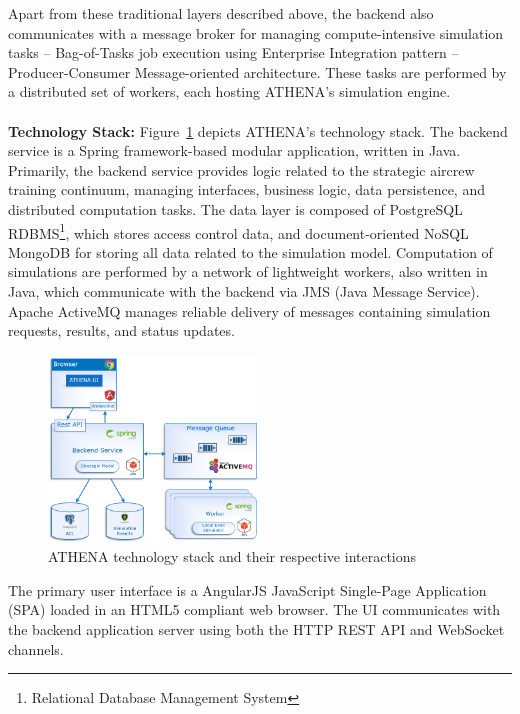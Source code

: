 Apart from these traditional layers described above, the backend also communicates with a message broker for managing compute-intensive simulation tasks -- Bag-of-Tasks job execution using Enterprise Integration pattern --  Producer-Consumer Message-oriented architecture. These tasks are performed by a distributed set of workers, each hosting ATHENA's simulation engine.
\\
\\
\textbf{Technology Stack:} \quad Figure~\ref{fig:techStack} depicts ATHENA's technology stack. The backend service is a Spring framework-based modular application, written in Java. Primarily, the backend service provides logic related to the strategic aircrew training continuum, managing interfaces, business logic, data persistence, and distributed computation tasks. The data layer is composed of PostgreSQL RDBMS\footnote{Relational Database Management System}, which stores access control data, and document-oriented NoSQL MongoDB for storing all data related to the simulation model. Computation of simulations are performed by a network of lightweight workers, also written in Java, which communicate with the backend via JMS (Java Message Service). Apache ActiveMQ manages reliable delivery of messages containing simulation requests, results, and status updates. 

\begin{figure}
\centering
\includegraphics[width=0.5\textwidth]{Figures/ATHENA_tech_stack}
\decoRule
\caption[ATHENA Technology Stack]{ATHENA technology stack and their respective interactions}
\label{fig:techStack}
\end{figure}

The primary user interface is a AngularJS JavaScript Single-Page Application (SPA) loaded in an HTML5 compliant web browser. The UI communicates with the backend application server using both the HTTP REST API and WebSocket channels.

